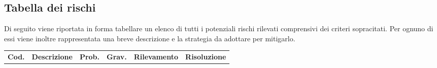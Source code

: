 \subsection{Tabella dei rischi}
        Di seguito viene riportata in forma tabellare un elenco di tutti i potenziali rischi rilevati comprensivi dei criteri sopracitati. Per ognuno di essi viene inoltre rappresentata una breve descrizione e la strategia da adottare per mitigarlo.
{
        \renewcommand{\arraystretch}{1.5}
        
        \begin{longtable}{|p{1cm}|p{3cm}|p{1cm}|p{1cm}|p{3cm}|p{3cm}|}
        \rowcolor{\primaryColor}
        \textcolor{\secondaryColor}{\textbf{Cod.}} & 
        \textcolor{\secondaryColor}{\textbf{Descrizione}} & 
        \textcolor{\secondaryColor}{\textbf{Prob.}} & 
        \textcolor{\secondaryColor}{\textbf{Grav.}} & 
        \textcolor{\secondaryColor}{\textbf{Rilevamento}} &
        \textcolor{\secondaryColor}{\textbf{Risoluzione}}\\
       

\end{longtable}}
